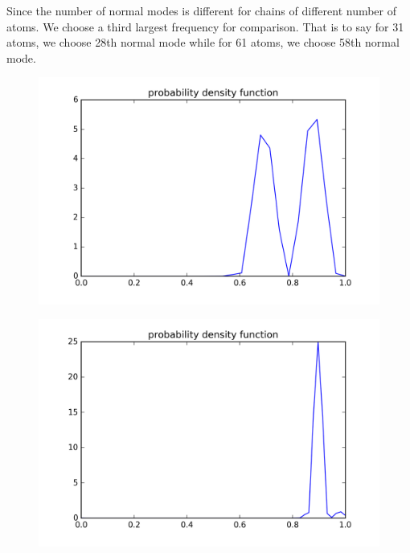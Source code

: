 Since the number of normal modes is different for chains of different number of atoms. We choose a third largest frequency for comparison. That is to say for 31 atoms, we choose 28th normal mode while for 61 atoms, we choose 58th normal mode.

\begin{figure}[!htbh]
\centering
\begin{minipage}{.45\textwidth}
  \centering
  \includegraphics[width=1.1\linewidth]{Harmonic_mass_ratio/densProb_0_5N_31m_2p_28th.png}
  \label{fig:mass length31 28th}
\end{minipage}\qquad
\begin{minipage}{.45\textwidth}
  \centering
  \includegraphics[width=1.1\linewidth]{Harmonic_mass_ratio/densProb_0_5N_61m_2p_58th.png}
  \label{fig:mass length61 58th}
\end{minipage}
\end{figure}


